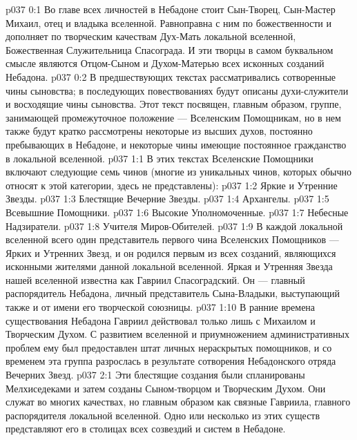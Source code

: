 \author{Блестящая Вечерняя Звезда}
\vs p037 0:1 Во главе всех личностей в Небадоне стоит Сын\hyp{}Творец, Сын\hyp{}Мастер Михаил, отец и владыка вселенной. Равноправна с ним по божественности и дополняет по творческим качествам Дух\hyp{}Мать локальной вселенной, Божественная Служительница Спасограда. И эти творцы в самом буквальном смысле являются Отцом\hyp{}Сыном и Духом\hyp{}Матерью всех исконных созданий Небадона.
\vs p037 0:2 В предшествующих текстах рассматривались сотворенные чины сыновства; в последующих повествованиях будут описаны духи\hyp{}служители и восходящие чины сыновства. Этот текст посвящен, главным образом, группе, занимающей промежуточное положение --- Вселенским Помощникам, но в нем также будут кратко рассмотрены некоторые из высших духов, постоянно пребывающих в Небадоне, и некоторые чины имеющие постоянное гражданство в локальной вселенной.
\vs p037 1:1 В этих текстах Вселенские Помощники включают следующие семь чинов (многие из уникальных чинов, которых обычно относят к этой категории, здесь не представлены):
\vs p037 1:2 \bibnobreakspace Яркие и Утренние Звезды.
\vs p037 1:3 \bibnobreakspace Блестящие Вечерние Звезды.
\vs p037 1:4 \bibnobreakspace Архангелы.
\vs p037 1:5 \bibnobreakspace Всевышние Помощники.
\vs p037 1:6 \bibnobreakspace Высокие Уполномоченные.
\vs p037 1:7 \bibnobreakspace Небесные Надзиратели.
\vs p037 1:8 \bibnobreakspace Учителя Миров\hyp{}Обителей.
\vs p037 1:9 \pc В каждой локальной вселенной всего один представитель первого чина Вселенских Помощников --- Ярких и Утренних Звезд, и он родился первым из всех созданий, являющихся исконными жителями данной локальной вселенной. Яркая и Утренняя Звезда нашей вселенной известна как Гавриил Спасоградский. Он --- главный распорядитель Небадона, личный представитель Сына\hyp{}Владыки, выступающий также и от имени его творческой союзницы.
\vs p037 1:10 В ранние времена существования Небадона Гавриил действовал только лишь с Михаилом и Творческим Духом. С развитием вселенной и приумножением административных проблем ему был предоставлен штат личных нераскрытых помощников, и со временем эта группа разрослась в результате сотворения Небадонского отряда Вечерних Звезд.
\vs p037 2:1 Эти блестящие создания были спланированы Мелхиседеками и затем созданы Сыном\hyp{}творцом и Творческим Духом. Они служат во многих качествах, но главным образом как связные Гавриила, главного распорядителя локальной вселенной. Одно или несколько из этих существ представляют его в столицах всех созвездий и систем в Небадоне.
